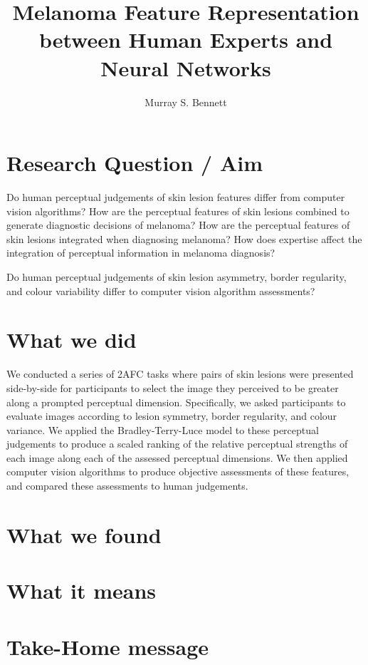 \documentclass[a4paper, natbib, doc, 12pt]{apa7}
\title{Melanoma Feature Representation between Human Experts and Neural Networks}
\author{Murray S. Bennett}
\begin{document}
\maketitle

\setlength{\parskip}{0pt}


\newpage
\section{Research Question / Aim}
Do human perceptual judgements of skin lesion features differ from computer vision algorithms?
How are the perceptual features of skin lesions combined to generate diagnostic decisions of melanoma?
How are the perceptual features of skin lesions integrated when diagnosing melanoma?
How does expertise affect the integration of perceptual information in melanoma diagnosis?

Do human perceptual judgements of skin lesion asymmetry, border regularity, and colour variability differ to computer vision algorithm assessments?

\section{What we did}
We conducted a series of 2AFC tasks where pairs of skin lesions were presented side-by-side for participants to select the image they perceived to be greater along a prompted perceptual dimension. Specifically, we asked participants to evaluate images according to lesion symmetry, border regularity, and colour variance. We applied the Bradley-Terry-Luce model to these perceptual judgements to produce a scaled ranking of the relative perceptual strengths of each image along each of the assessed perceptual dimensions. We then applied computer vision algorithms to produce objective assessments of these features, and compared these assessments to human judgements.

\section{What we found}


\section{What it means}


\section{Take-Home message}
\end{document}
